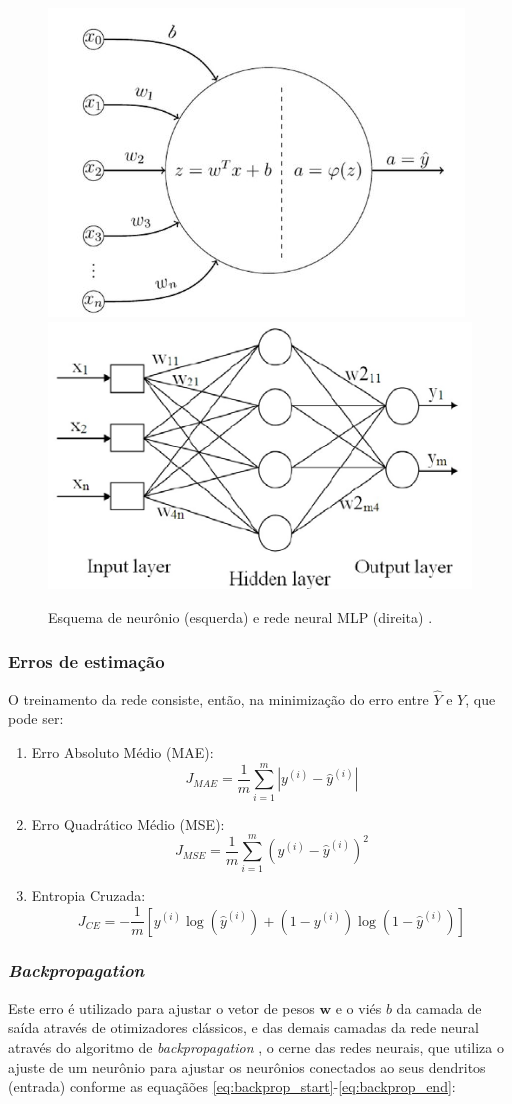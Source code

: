 \begin{figure}[hbt!]
    \centering
    \includegraphics[width=0.46\linewidth]{Imagens/chap02/neuron_scheme.png}
    \includegraphics[width=0.46\linewidth]{Imagens/chap02/mlp_scheme.png}
    \caption{Esquema de neurônio (esquerda) e rede neural MLP (direita) \cite{minsky1969perceptrons}.}
    \label{fig:mlp_scheme}
\end{figure}

\subsubsection{Erros de estimação}
O treinamento da rede consiste, então, na minimização do erro entre $\hat{Y}$ e $Y$, que pode ser:
\begin{enumerate}
    \item Erro Absoluto Médio (MAE):
    \begin{equation}
        J_{MAE} = \frac{1}{m} \sum_{i=1}^m |y^{(i)} - \hat{y}^{(i)}|
    \end{equation}
    \item Erro Quadrático Médio (MSE):
    \begin{equation}
        J_{MSE} = \frac{1}{m} \sum_{i=1}^m (y^{(i)} - \hat{y}^{(i)})^2
    \end{equation}
    \item Entropia Cruzada: 
    \begin{equation}
        J_{CE} = -\frac{1}{m}[y^{(i)}\log(\hat{y}^{(i)}) + (1-y^{(i)})\log(1-\hat{y}^{(i)})]
    \end{equation}
\end{enumerate}

\subsubsection{\textit{Backpropagation}}
Este erro é utilizado para ajustar o vetor de pesos $\mathbf{w}$ e o viés $b$ da camada de saída através de otimizadores clássicos, e das demais camadas da rede neural através do algoritmo de \textit{backpropagation} \cite{hecht1992theory}, o cerne das redes neurais, que utiliza o ajuste de um neurônio para ajustar os neurônios conectados ao seus dendritos (entrada) conforme as equaçãões \ref{eq:backprop_start}-\ref{eq:backprop_end}:

